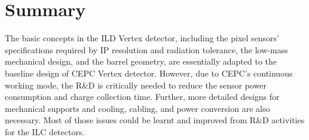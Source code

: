 \section{Summary}

The basic concepts in the ILD Vertex detector, including the pixel sensors' specifications required by IP resolution and radiation tolerance, the low-mass mechanical design, and the barrel geometry, are essentially adapted to the baseline design of CEPC Vertex detector. However, due to CEPC's continuous working mode, the R\&D is critically needed to reduce the sensor power consumption and charge collection time. Further, more detailed designs for mechanical supports and cooling, cabling, and power conversion are also necessary. Most of those issues could be learnt and improved from R\&D activities for the ILC detectors. 





